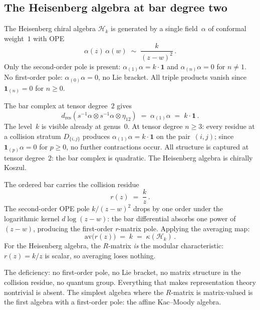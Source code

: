 \documentclass[11pt,reqno]{amsart}
\theoremstyle{definition}
\theoremstyle{remark}
\newcommand{\cH}{\mathcal{H}}
\numberwithin{equation}{section}
\begin{document}
\subsection{The Heisenberg algebra at bar degree two}
\label{ssec:heisenberg}

The Heisenberg chiral algebra $\cH_k$ is generated by a
single field~$\alpha$ of conformal weight~$1$ with OPE
\begin{equation}\label{eq:heis-ope}
\alpha(z)\,\alpha(w)
\;\sim\;
\frac{k}{(z-w)^2}\,.
\end{equation}
Only the second-order pole is present:
$\alpha_{(1)}\alpha = k \cdot \mathbf{1}$ and
$\alpha_{(n)}\alpha = 0$ for $n \neq 1$. No first-order
pole: $\alpha_{(0)}\alpha = 0$, no Lie bracket.
All triple products vanish since
$\mathbf{1}_{(n)} = 0$ for $n \ge 0$.

The bar complex at tensor degree~$2$ gives
\begin{equation}\label{eq:heis-bar2}
d_{\mathrm{res}}
(s^{-1}\alpha \otimes s^{-1}\alpha \otimes \eta_{12})
\;=\;
\alpha_{(1)}\alpha
\;=\;
k \cdot \mathbf{1}\,.
\end{equation}
The level~$k$ is visible already at genus~$0$. At tensor
degree $n \ge 3$: every residue at a collision stratum
$D_{\{i,j\}}$ produces $\alpha_{(1)}\alpha = k \cdot \mathbf{1}$
on the pair~$(i,j)$; since $\mathbf{1}_{(p)}\alpha = 0$ for
$p \ge 0$, no further contractions occur. All structure is
captured at tensor degree~$2$: the bar complex is quadratic.
The Heisenberg algebra is chirally Koszul.

The ordered bar carries the collision residue
\begin{equation}\label{eq:heis-r}
r(z) \;=\; \frac{k}{z}\,.
\end{equation}
The second-order OPE pole $k/(z-w)^2$ drops by one order under
the logarithmic kernel $d\log(z-w)$: the bar differential
absorbs one power of $(z-w)$, producing the first-order
$r$-matrix pole. Applying the averaging map:
\begin{equation}\label{eq:heis-kappa}
\mathrm{av}\bigl(r(z)\bigr)
\;=\;
k
\;=\;
\kappa(\cH_k)\,.
\end{equation}
For the Heisenberg algebra, the $R$-matrix \emph{is}
the modular characteristic: $r(z) = k/z$ is scalar, so
averaging loses nothing.

The deficiency: no first-order pole, no Lie bracket, no
matrix structure in the collision residue, no quantum group.
Everything that makes representation theory nontrivial is
absent. The simplest algebra where the $R$-matrix is
matrix-valued is the first algebra with a first-order pole:
the affine Kac--Moody algebra.
\end{document}
